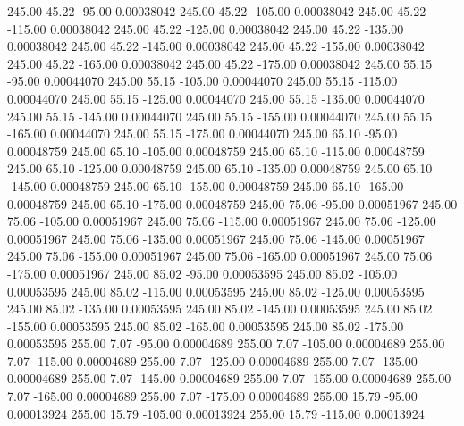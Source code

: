     245.00     45.22    -95.00     0.00038042
    245.00     45.22   -105.00     0.00038042
    245.00     45.22   -115.00     0.00038042
    245.00     45.22   -125.00     0.00038042
    245.00     45.22   -135.00     0.00038042
    245.00     45.22   -145.00     0.00038042
    245.00     45.22   -155.00     0.00038042
    245.00     45.22   -165.00     0.00038042
    245.00     45.22   -175.00     0.00038042
    245.00     55.15    -95.00     0.00044070
    245.00     55.15   -105.00     0.00044070
    245.00     55.15   -115.00     0.00044070
    245.00     55.15   -125.00     0.00044070
    245.00     55.15   -135.00     0.00044070
    245.00     55.15   -145.00     0.00044070
    245.00     55.15   -155.00     0.00044070
    245.00     55.15   -165.00     0.00044070
    245.00     55.15   -175.00     0.00044070
    245.00     65.10    -95.00     0.00048759
    245.00     65.10   -105.00     0.00048759
    245.00     65.10   -115.00     0.00048759
    245.00     65.10   -125.00     0.00048759
    245.00     65.10   -135.00     0.00048759
    245.00     65.10   -145.00     0.00048759
    245.00     65.10   -155.00     0.00048759
    245.00     65.10   -165.00     0.00048759
    245.00     65.10   -175.00     0.00048759
    245.00     75.06    -95.00     0.00051967
    245.00     75.06   -105.00     0.00051967
    245.00     75.06   -115.00     0.00051967
    245.00     75.06   -125.00     0.00051967
    245.00     75.06   -135.00     0.00051967
    245.00     75.06   -145.00     0.00051967
    245.00     75.06   -155.00     0.00051967
    245.00     75.06   -165.00     0.00051967
    245.00     75.06   -175.00     0.00051967
    245.00     85.02    -95.00     0.00053595
    245.00     85.02   -105.00     0.00053595
    245.00     85.02   -115.00     0.00053595
    245.00     85.02   -125.00     0.00053595
    245.00     85.02   -135.00     0.00053595
    245.00     85.02   -145.00     0.00053595
    245.00     85.02   -155.00     0.00053595
    245.00     85.02   -165.00     0.00053595
    245.00     85.02   -175.00     0.00053595
    255.00      7.07    -95.00     0.00004689
    255.00      7.07   -105.00     0.00004689
    255.00      7.07   -115.00     0.00004689
    255.00      7.07   -125.00     0.00004689
    255.00      7.07   -135.00     0.00004689
    255.00      7.07   -145.00     0.00004689
    255.00      7.07   -155.00     0.00004689
    255.00      7.07   -165.00     0.00004689
    255.00      7.07   -175.00     0.00004689
    255.00     15.79    -95.00     0.00013924
    255.00     15.79   -105.00     0.00013924
    255.00     15.79   -115.00     0.00013924
